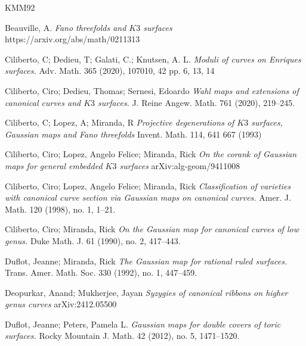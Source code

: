 \documentclass[11pt,twoside]{amsart}
\theoremstyle{plain}
\numberwithin{equation}{section}
\theoremstyle{definition}
\begin{document}
\begin{thebibliography}{KMM92}



Beauville, A. \emph{Fano threefolds and $K3$ surfaces}
https://arxiv.org/abs/math/0211313

Ciliberto, C; Dedieu, T;  Galati, C.; Knutsen, A. L.  
\emph{Moduli of curves on Enriques surfaces.}
Adv. Math. 365 (2020), 107010, 42 pp. 6, 13, 14

Ciliberto, Ciro; Dedieu, Thomas; Sernesi, Edoardo
\emph{Wahl maps and extensions of canonical curves and $K3$ surfaces.}
J. Reine Angew. Math. 761 (2020), 219–245.

Ciliberto, C; Lopez, A; Miranda, R
\emph{Projective degenerations of $K3$ surfaces, Gaussian maps and Fano threefolds}
Invent. Math. 114, 641 667 (1993)

Ciliberto, Ciro; Lopez, Angelo Felice; Miranda, Rick
\emph{On the corank of Gaussian maps for general embedded $K3$ surfaces}
arXiv:alg-geom/9411008

Ciliberto, Ciro; Lopez, Angelo Felice; Miranda, Rick
\emph{Classification of varieties with canonical curve section via Gaussian maps on canonical curves.}
Amer. J. Math.   120 (1998), no. 1, 1–21.

Ciliberto, Ciro; Miranda, Rick
\emph{On the Gaussian map for canonical curves of low genus.}
Duke Math. J. 61 (1990), no. 2, 417–443.

Duflot, Jeanne; Miranda, Rick
\emph{The Gaussian map for rational ruled surfaces.}
Trans. Amer. Math. Soc. 330 (1992), no. 1, 447–459.

Deopurkar, Anand; Mukherjee, Jayan
\emph{Syzygies of canonical ribbons on higher genus curves}
arXiv:2412.05500


Duflot, Jeanne; Peters, Pamela L.
\emph{Gaussian maps for double covers of toric surfaces.}
Rocky Mountain J. Math. 42 (2012), no. 5, 1471–1520.













\end{thebibliography}
\end{document}
